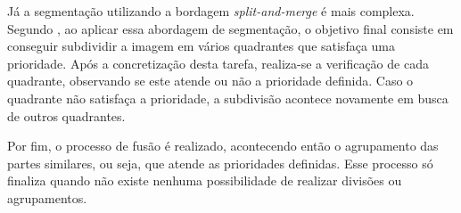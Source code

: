 Já a segmentação utilizando a bordagem \textit{split-and-merge} é mais complexa. Segundo , ao aplicar essa abordagem de segmentação, o objetivo final consiste em conseguir subdividir a imagem em vários quadrantes que satisfaça uma prioridade. Após a concretização desta tarefa, realiza-se a verificação de cada quadrante, observando se este atende ou não a prioridade definida. Caso o quadrante não satisfaça a prioridade, a subdivisão acontece novamente em busca de outros quadrantes.

Por fim, o processo de fusão é realizado, acontecendo então o agrupamento das partes similares, ou seja, que atende as prioridades definidas. Esse processo só finaliza quando não existe nenhuma possibilidade de realizar divisões ou agrupamentos.
